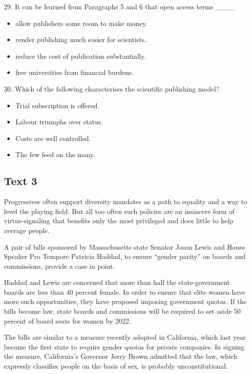 \documentclass[UTF8,11pt]{ctexart}
\begin{document}
29. It can be learned from Paragraphs 5 and 6 that open access terms \_\_\_\_


\begin{itemize}[leftmargin=2em,itemsep=.2em,topsep=.4em]\item[A.] allow publishers some room to make money.
\item[B.] render publishing much easier for scientists.
\item[C.] reduce the cost of publication substantially.
\item[D.] free universities from financial burdens.
\end{itemize}

30. Which of the following characterises the scientific publishing model?


\begin{itemize}[leftmargin=2em,itemsep=.2em,topsep=.4em]\item[A.] Trial subscription is offered.
\item[B.] Labour triumphs over status.
\item[C.] Costs are well controlled.
\item[D.] The few feed on the many.
\end{itemize}

\subsection*{\textbf{Text 3}}


Progressives often support diversity mandates as a path to equality and a way to level the playing field. But all too often such policies are an insincere form of virtue-signaling that benefits only the most privileged and does little to help average people.


A pair of bills sponsored by Massachusetts state Senator Jason Lewis and House Speaker Pro Tempore Patricia Haddad, to ensure “gender parity” on boards and commissions, provide a case in point.


Haddad and Lewis are concerned that more than half the state-government boards are less than 40 percent female. In order to ensure that elite women have more such opportunities, they have proposed imposing government quotas. If the bills become law, state boards and commissions will be required to set aside 50 percent of board seats for women by 2022.


The bills are similar to a measure recently adopted in California, which last year became the first state to require gender quotas for private companies. In signing the measure, California’s Governor Jerry Brown admitted that the law, which expressly classifies people on the basis of sex, is probably unconstitutional.
\end{document}
